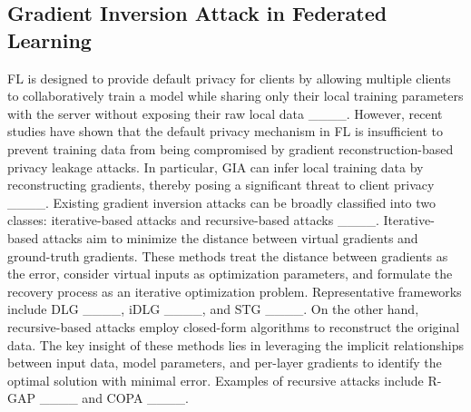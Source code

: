 \subsection{Gradient Inversion Attack in Federated Learning}
FL is designed to provide default privacy for clients by allowing multiple clients to collaboratively train a model while sharing only their local training parameters with the server without exposing their raw local data ____. However, recent studies have shown that the default privacy mechanism in FL is insufficient to prevent training data from being compromised by gradient reconstruction-based privacy leakage attacks. In particular, GIA can infer local training data by reconstructing gradients, thereby posing a significant threat to client privacy ____.
Existing gradient inversion attacks can be broadly classified into two classes: iterative-based attacks and recursive-based attacks ____. Iterative-based attacks aim to minimize the distance between virtual gradients and ground-truth gradients. These methods treat the distance between gradients as the error, consider virtual inputs as optimization parameters, and formulate the recovery process as an iterative optimization problem. Representative frameworks include DLG ____, iDLG ____, and STG ____. On the other hand, recursive-based attacks employ closed-form algorithms to reconstruct the original data. The key insight of these methods lies in leveraging the implicit relationships between input data, model parameters, and per-layer gradients to identify the optimal solution with minimal error. Examples of recursive attacks include R-GAP ____ and COPA ____.

